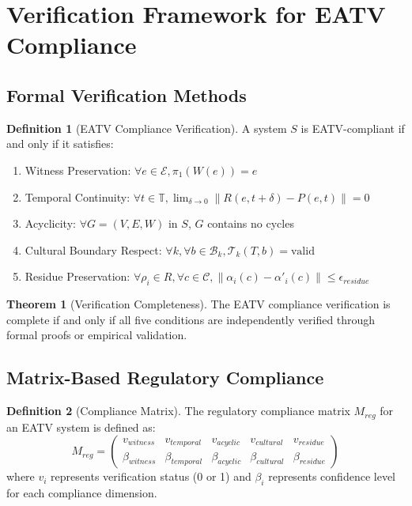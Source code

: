 \documentclass[11pt]{article}
\theoremstyle{definition}
\newtheorem{definition}{Definition}
\newtheorem{theorem}{Theorem}
\begin{document}
\section{Verification Framework for EATV Compliance}

\subsection{Formal Verification Methods}

\begin{definition}[EATV Compliance Verification]
A system $S$ is EATV-compliant if and only if it satisfies:
\begin{enumerate}
    \item Witness Preservation: $\forall e \in \mathcal{E}, \pi_1(W(e)) = e$
    \item Temporal Continuity: $\forall t \in \mathbb{T}, \lim_{\delta \to 0} \| R(e, t+\delta) - P(e, t) \| = 0$
    \item Acyclicity: $\forall G = (V, E, W)$ in $S$, $G$ contains no cycles
    \item Cultural Boundary Respect: $\forall k, \forall b \in \mathcal{B}_k, \mathcal{T}_k(T, b) = \text{valid}$
    \item Residue Preservation: $\forall \rho_i \in R, \forall c \in \mathcal{C}, \| \alpha_i(c) - \alpha'_i(c) \| \leq \epsilon_{residue}$
\end{enumerate}
\end{definition}

\begin{theorem}[Verification Completeness]
The EATV compliance verification is complete if and only if all five conditions are independently verified through formal proofs or empirical validation.
\end{theorem}

\subsection{Matrix-Based Regulatory Compliance}

\begin{definition}[Compliance Matrix]
The regulatory compliance matrix $M_{reg}$ for an EATV system is defined as:
\begin{equation}
M_{reg} = 
\begin{pmatrix}
v_{witness} & v_{temporal} & v_{acyclic} & v_{cultural} & v_{residue} \\
\beta_{witness} & \beta_{temporal} & \beta_{acyclic} & \beta_{cultural} & \beta_{residue}
\end{pmatrix}
\end{equation}
where $v_i$ represents verification status (0 or 1) and $\beta_i$ represents confidence level for each compliance dimension.
\end{definition}
\end{document}
